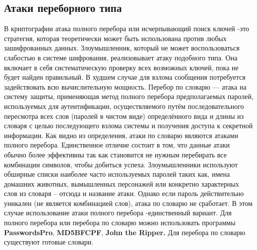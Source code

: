 \documentclass[a4paper,14pt]{report}
\begin{document}
\subsection{Атаки переборного типа}
В криптографии атака полного перебора или исчерпывающий поиск ключей -это стратегия, которая теоретически может быть использована против любых зашифрованных данных. Злоумышленник, который не может воспользоваться слабостью в системе шифрования, реализовывает атаку подобного типа. Она включает в себя систематическую проверку всех возможных ключей, пока не будет найден правильный. В худшем случае для взлома сообщения потребуется задействовать всю вычислительную мощность. 
Перебор по словарю — атака на систему защиты, применяющая метод полного перебора предполагаемых паролей, используемых для аутентификации, осуществляемого путём последовательного пересмотра всех слов (паролей в чистом виде) определённого вида и длины из словаря с целью последующего взлома системы и получения доступа к секретной информации.
Как видно из определения, атаки по словарю являются атаками полного перебора. Единственное отличие состоит в том, что данные атаки обычно более эффективны так как становится не нужным перебирать все комбинации символов, чтобы добиться успеха. Злоумышленники используют обширные списки наиболее часто используемых паролей таких как, имена домашних животных, вымышленных персонажей или конкретно характерных слов из словаря – отсюда и название атаки. Однако если пароль действительно уникален (не является комбинацией слов), атака по словарю не сработает. В этом случае использование атаки полного перебора -единственный вариант.
Для полного перебора или перебора по словарю можно использовать программы \textbf{PasswordsPro}, \textbf{MD5BFCPF}, \textbf{John the Ripper.} Для перебора по словарю существуют готовые словари.
\end{document}
